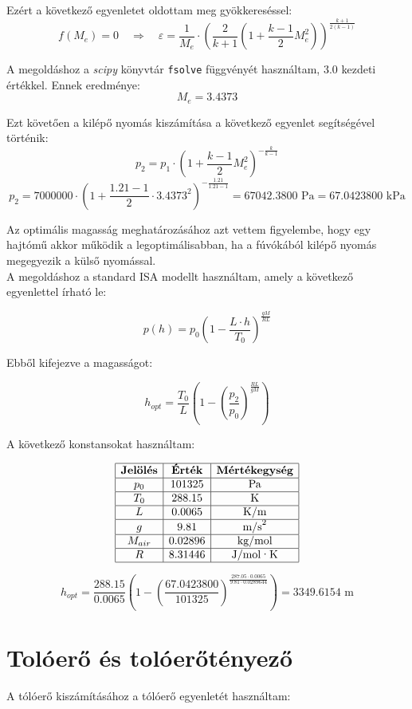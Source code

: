 \documentclass[a4paper,12pt]{article}
\begin{document}
Ezért a következő egyenletet oldottam meg gyökkereséssel:
\[
f(M_e) = 0 \quad \Rightarrow \quad \varepsilon = \frac{1}{M_e} \cdot \left( \frac{2}{k+1} \left(1 + \frac{k-1}{2}M_e^2 \right) \right)^{\frac{k+1}{2(k-1)}}
\]

A megoldáshoz a \textit{scipy} könyvtár \texttt{fsolve} függvényét használtam, 3.0 kezdeti értékkel.
Ennek eredménye:
\[
M_e = 3.4373
\]

Ezt követően a kilépő nyomás kiszámítása a következő egyenlet segítségével történik:
\[
p_2 = p_1 \cdot \left(1 + \frac{k - 1}{2} M_e^2 \right)^{-\frac{k}{k - 1}}
\]
\[
p_2 = 7000000 \cdot \left(1 + \frac{1.21 - 1}{2} \cdot 3.4373^2 \right)^{-\frac{1.21}{1.21 - 1}} = 67042.3800 \text{ Pa} = 67.0423800 \text{ kPa}
\]

Az optimális magasság meghatározásához azt vettem figyelembe, hogy egy hajtómű akkor működik a legoptimálisabban, ha a fúvókából kilépő nyomás megegyezik a külső nyomással.\\
A megoldáshoz a standard ISA modellt használtam, amely a következő egyenlettel írható le:

\[
p(h) = p_0 \left(1 - \frac{L \cdot h}{T_0} \right)^{\frac{g M}{R L}}
\]

Ebből kifejezve a magasságot:

\[
h_{opt} = \frac{T_0}{L} \left( 1 - \left( \frac{p_2}{p_0} \right)^{\frac{R L}{g M}} \right)
\]

A következő konstansokat használtam:

\[
\begin{array}{|c|c|c|}
\hline
\textbf{Jelölés} & \textbf{Érték} & \textbf{Mértékegység} \\
\hline
p_0 & 101325 & \text{Pa} \\
\hline
T_0 & 288.15 & \text{K} \\
\hline
L & 0.0065 & \text{K/m} \\
\hline
g & 9.81 & \text{m/s}^2 \\
\hline
M_{air} & 0.02896 & \text{kg/mol} \\
\hline
R & 8.31446 & \text{J/mol·K} \\
\hline
\end{array}
\]

\[
h_{opt} = \frac{288.15}{0.0065} \left( 1 - \left( \frac{67.0423800}{101325} \right)^{\frac{287.05 \cdot 0.0065}{9.81 \cdot 0.0289644}} \right) = 3349.6154 \text{ m}
\]

\section{Tolóerő és tolóerőtényező}
A tólóerő kiszámításához a tólóerő egyenletét használtam:
\end{document}
